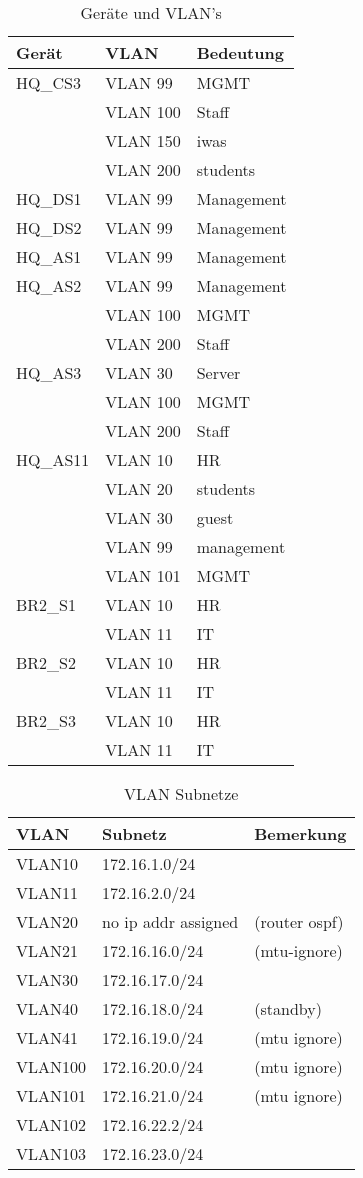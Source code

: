 \begin{table}[h]
	\centering
	\begin{tabu} to \linewidth {l l l}
		\toprule 
		Gerät & VLAN & Bedeutung \\
		\midrule
		HQ\_CS3	& VLAN 99 & MGMT \\
				& VLAN 100 & Staff \\
				& VLAN 150 & iwas \\
				& VLAN 200 & students \\
		HQ\_DS1	& VLAN 99  & Management \\
		HQ\_DS2	& VLAN 99  & Management \\
		HQ\_AS1	& VLAN 99  & Management \\
		HQ\_AS2	& VLAN 99  & Management \\
				& VLAN 100 & MGMT \\
				& VLAN 200 & Staff \\	
		HQ\_AS3 & VLAN 30  & Server \\
				& VLAN 100 & MGMT \\
				& VLAN 200 & Staff \\
		HQ\_AS11& VLAN 10 & HR \\
				& VLAN 20 & students \\
				& VLAN 30 & guest \\
				& VLAN 99 & management \\
				& VLAN 101 & MGMT \\
		BR2\_S1 & VLAN 10 & HR \\
				& VLAN 11 & IT \\
		BR2\_S2 & VLAN 10 & HR \\
				& VLAN 11 & IT \\
		BR2\_S3 & VLAN 10 & HR \\
				& VLAN 11 & IT \\
		\bottomrule 
	\end{tabu} 
	\label{tbl:vlan_all}
	\caption{Geräte und VLAN's}
\end{table}

\begin{table}[h]
	\centering
	\begin{tabu} to \linewidth {l l l}
		\toprule 
		VLAN & Subnetz & Bemerkung \\
		\midrule
		VLAN10 & 172.16.1.0/24 & \\
		VLAN11 & 172.16.2.0/24 & \\
		VLAN20 & no ip addr assigned & (router ospf) \\
		VLAN21 & 172.16.16.0/24 & (mtu-ignore) \\
		VLAN30 & 172.16.17.0/24 & \\
		VLAN40 & 172.16.18.0/24 & (standby) \\
		VLAN41 & 172.16.19.0/24 & (mtu ignore) \\
		VLAN100 & 172.16.20.0/24 & (mtu ignore) \\
		VLAN101 & 172.16.21.0/24 & (mtu ignore) \\
		VLAN102 & 172.16.22.2/24 & \\
		VLAN103 & 172.16.23.0/24 & \\
		\bottomrule 
	\end{tabu} 
	\caption{VLAN Subnetze}
\end{table}

